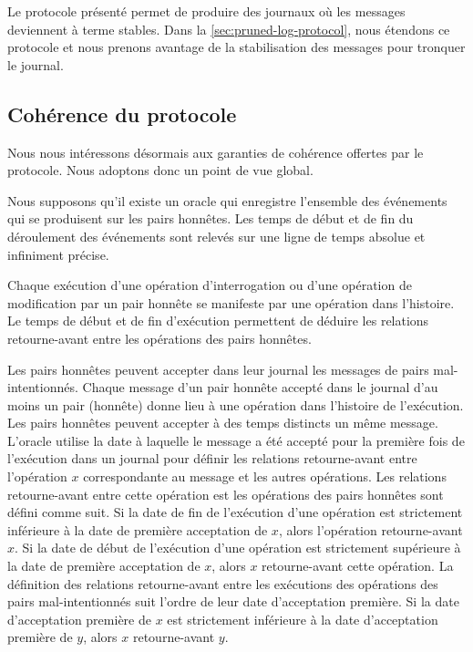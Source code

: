 Le protocole présenté permet de produire des journaux où les messages deviennent à terme stables.
Dans la \autoref{sec:pruned-log-protocol}, nous étendons ce protocole et nous prenons avantage de la stabilisation des messages pour tronquer le journal.


\subsection{Cohérence du protocole}

Nous nous intéressons désormais aux garanties de cohérence offertes par le protocole.
Nous adoptons donc un point de vue global.

Nous supposons qu'il existe un oracle qui enregistre l'ensemble des événements qui se produisent sur les pairs honnêtes.
Les temps de début et de fin du déroulement des événements sont relevés sur une ligne de temps absolue et infiniment précise.

Chaque exécution d'une opération d'interrogation ou d'une opération de modification par un pair honnête se manifeste par une opération dans l'histoire.
Le temps de début et de fin d'exécution permettent de déduire les relations retourne-avant entre les opérations des pairs honnêtes.

Les pairs honnêtes peuvent accepter dans leur journal les messages de pairs mal-intentionnés.
Chaque message d'un pair honnête accepté dans le journal d'au moins un pair (honnête) donne lieu à une opération dans l'histoire de l'exécution.
Les pairs honnêtes peuvent accepter à des temps distincts un même message.
L'oracle utilise la date à laquelle le message a été accepté pour la première fois de l'exécution dans un journal pour définir les relations retourne-avant entre l'opération $x$ correspondante au message et les autres opérations.
Les relations retourne-avant entre cette opération est les opérations des pairs honnêtes sont défini comme suit.
Si la date de fin de l'exécution d'une opération est strictement inférieure à la date de première acceptation de $x$, alors l'opération retourne-avant $x$.
Si la date de début de l'exécution d'une opération est strictement supérieure à la date de première acceptation de $x$, alors $x$ retourne-avant cette opération.
La définition des relations retourne-avant entre les exécutions des opérations des pairs mal-intentionnés suit l'ordre de leur date d'acceptation première.
Si la date d'acceptation première de $x$ est strictement inférieure à la date d'acceptation première de $y$, alors $x$ retourne-avant $y$.


